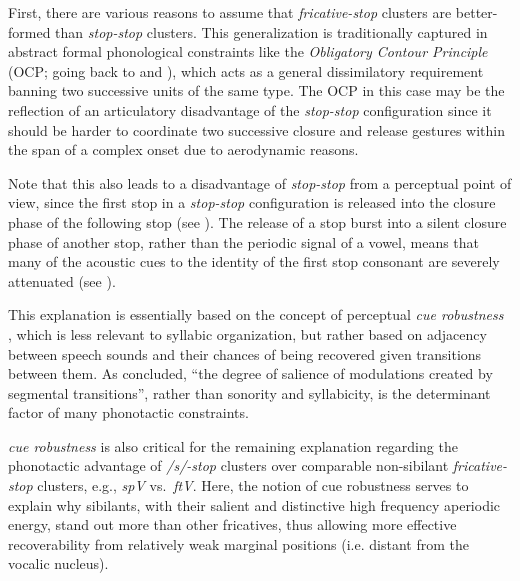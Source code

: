 First, there are various reasons to assume that \emph{fricative-stop} clusters are better-formed than \emph{stop-stop} clusters. This generalization is traditionally captured in abstract formal phonological constraints like the \emph{Obligatory Contour Principle} (OCP; going back to \citealt{leben1973suprasegmental, goldsmith1976autosegmental} and \citealt{mccarthy1979formalsk}), which acts as a general dissimilatory requirement banning two successive units of the same type. The OCP in this case may be the reflection of an articulatory disadvantage of the \emph{stop-stop} configuration since it should be harder to coordinate two successive closure and release gestures within the span of a complex onset due to aerodynamic reasons.

Note that this also leads to a disadvantage of \emph{stop-stop} from a perceptual point of view, since the first stop in a \emph{stop-stop} configuration is released into the closure phase of the following stop (see \citealt{surprenant1998perception}). The release of a stop burst into a silent closure phase of another stop, rather than the periodic signal of a vowel, means that many of the acoustic cues to the identity of the first stop consonant are severely attenuated (see \citealt{fujimura1978perception}).

This explanation is essentially based on the concept of perceptual \emph{cue robustness} \citep{wright2004review}, which is less relevant to syllabic organization, but rather
based on adjacency between speech sounds and their chances of being recovered given transitions between them. As 
\citet[361]{kawasaki1997alternativessk}
concluded, \enquote{the degree of salience of modulations created by segmental transitions}, rather than sonority and syllabicity, is the determinant factor of many phonotactic constraints.

\emph{cue robustness}
is also critical for the remaining explanation regarding the phonotactic advantage of \emph{/s/-stop} clusters over comparable non-sibilant \emph{fricative-stop} clusters, e.g., \emph{spV} vs.~\emph{ftV}.
Here, the notion of cue robustness serves to explain why sibilants, with their salient and distinctive high frequency aperiodic energy, stand out more than other fricatives, thus allowing more effective recoverability from relatively weak marginal positions (i.e. distant from the vocalic nucleus).

